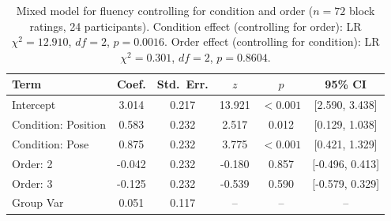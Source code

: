 \begin{table}[htbp]
\centering
\caption{Mixed model for fluency controlling for condition and order ($n = 72$ block ratings, 24 participants). Condition effect (controlling for order): LR $\chi^2 = 12.910$, $df = 2$, $p = 0.0016$. Order effect (controlling for condition): LR $\chi^2 = 0.301$, $df = 2$, $p = 0.8604$.}
\label{tab:mixedmodel-fluency}
\begin{tabular}{lccccc}
\toprule
Term & Coef. & Std.\ Err. & $z$ & $p$ & 95\% CI \\
\midrule
Intercept                & 3.014  & 0.217 & 13.921 & $<0.001$ & [2.590, 3.438] \\
Condition: Position      & 0.583  & 0.232 & 2.517  & 0.012    & [0.129, 1.038] \\
Condition: Pose          & 0.875  & 0.232 & 3.775  & $<0.001$ & [0.421, 1.329] \\
Order: 2                 & -0.042 & 0.232 & -0.180 & 0.857    & [-0.496, 0.413] \\
Order: 3                 & -0.125 & 0.232 & -0.539 & 0.590    & [-0.579, 0.329] \\
\midrule
Group Var                & 0.051  & 0.117 & --     & --       & -- \\
\bottomrule
\end{tabular}
\end{table}

